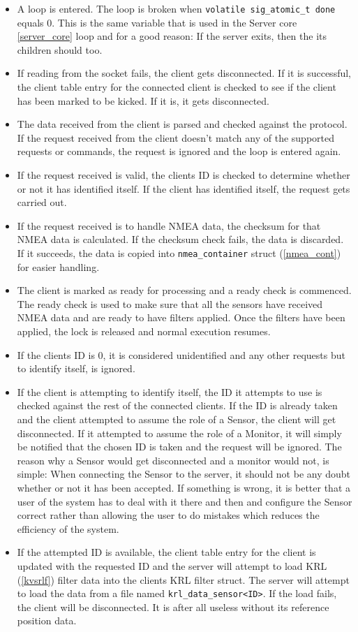 \documentclass[12pt,english,a4paper]{report}
\begin{document}
\begin{itemize}
  \item A loop is entered. The loop is broken when \texttt{volatile sig\_atomic\_t done}\label{atomic_done} equals 0. This is the same variable that is used in the Server core \ref{server_core} loop and for a good reason: If the server exits, then the its children should too. 
  \item If reading from the socket fails, the client gets disconnected. If it is successful, the client table entry for the connected client is checked to see if the client has been marked to be kicked. If it is, it gets disconnected. 
  \item The data received from the client is parsed and checked against the protocol. If the request received from the client doesn't match any of the supported requests or commands, the request is ignored and the loop is entered again. 
  \item If the request received is valid, the clients ID is checked to determine whether or not it has identified itself. If the client has identified itself, the request gets carried out. 
  \item If the request received is to handle NMEA data, the checksum for that NMEA data is calculated. If the checksum check fails, the data is discarded. If it succeeds, the data is copied into \texttt{nmea\_container} struct (\ref{nmea_cont}) for easier handling.
  \item The client is marked as ready for processing and a ready check is commenced. The ready check is used to make sure that all the sensors have received NMEA data and are ready to have filters applied. Once the filters have been applied, the lock is released and normal execution resumes.
  \item If the clients ID is 0, it is considered unidentified and any other requests but to identify itself, is ignored.
  \item If the client is attempting to identify itself, the ID it attempts to use is checked against the rest of the connected clients. If the ID is already taken and the client attempted to assume the role of a Sensor, the client will get disconnected. If it attempted to assume the role of a Monitor, it will simply be notified that the chosen ID is taken and the request will be ignored. The reason why a Sensor would get disconnected and a monitor would not, is simple: When connecting the Sensor to the server, it should not be any doubt whether or not it has been accepted. If something is wrong, it is better that a user of the system has to deal with it there and then and configure the Sensor correct rather than allowing the user to do mistakes which reduces the efficiency of the system. 
  \item If the attempted ID is available, the client table entry for the client is updated with the requested ID and the server will attempt to load KRL (\ref{kvsrlf}) filter data into the clients KRL filter struct. The server will attempt to load the data from a file named \texttt{krl\_data\_sensor<ID>}. If the load fails, the client will be disconnected. It is after all useless without its reference position data.
\end{itemize}
\end{document}
